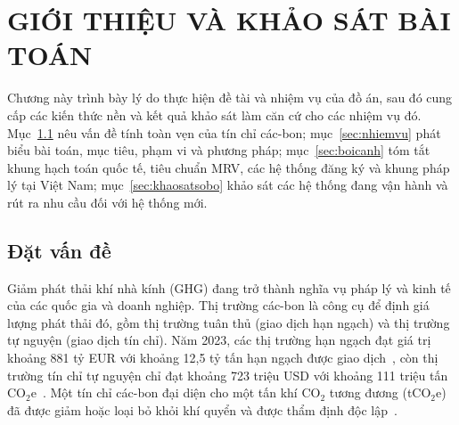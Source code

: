 
\chapter{GIỚI THIỆU VÀ KHẢO SÁT BÀI TOÁN}
\label{chap:khaosat}

Chương này trình bày lý do thực hiện đề tài và nhiệm vụ của đồ án, sau đó cung cấp các kiến thức nền và kết quả khảo sát làm căn cứ cho các nhiệm vụ đó. Mục~\ref{sec:datvande} nêu vấn đề tính toàn vẹn của tín chỉ các-bon; mục~\ref{sec:nhiemvu} phát biểu bài toán, mục tiêu, phạm vi và phương pháp; mục~\ref{sec:boicanh} tóm tắt khung hạch toán quốc tế, tiêu chuẩn MRV, các hệ thống đăng ký và khung pháp lý tại Việt Nam; mục~\ref{sec:khaosatsobo} khảo sát các hệ thống đang vận hành và rút ra nhu cầu đối với hệ thống mới.

\section{Đặt vấn đề}
\label{sec:datvande}
\label{sec:dongluc}

Giảm phát thải khí nhà kính (GHG) đang trở thành nghĩa vụ pháp lý và kinh tế của các quốc gia và doanh nghiệp. Thị trường các-bon là công cụ để định giá lượng phát thải đó, gồm thị trường tuân thủ (giao dịch hạn ngạch) và thị trường tự nguyện (giao dịch tín chỉ). Năm 2023, các thị trường hạn ngạch đạt giá trị khoảng 881 tỷ EUR với khoảng 12,5 tỷ tấn hạn ngạch được giao dịch~\cite{lseg2024yir}, còn thị trường tín chỉ tự nguyện chỉ đạt khoảng 723 triệu USD với khoảng 111 triệu tấn CO$_2$e~\cite{foresttrends2024sovcm}. Một tín chỉ các-bon đại diện cho một tấn khí CO$_2$ tương đương (tCO$_2$e) đã được giảm hoặc loại bỏ khỏi khí quyển và được thẩm định độc lập~\cite{verra2024vcs}.

